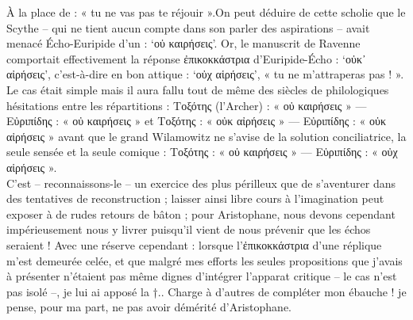 {{À la place de : « tu ne vas pas te réjouir ».}On peut déduire de cette scholie que le Scythe – qui ne tient aucun compte dans son parler des aspirations – avait menacé Écho-Euripide d'un : `οὐ καιρήσεις'. Or, le manuscrit de Ravenne comportait effectivement la réponse ἐπικοκκάστρια d'Euripide-Écho : `οὐκ᾽ αἰρήσεις', c'est-à-dire en bon attique : `οὐχ αἱρήσεις', « tu ne m'attraperas pas ! ». Le cas était simple mais il aura fallu tout de même des siècles de philologiques hésitations entre les répartitions : Τοξότης (l'Archer) : « οὐ καιρήσεις » — Εὐριπίδης : « οὐ καιρήσεις » et Τοξότης : « οὐκ αἰρήσεις » — Εὐριπίδης : « οὐκ αἰρήσεις » avant que le grand Wilamowitz ne s'avise de la solution conciliatrice, la seule sensée et la seule comique : Τοξότης : « οὐ καιρήσεις » — Εὐριπίδης : « οὐχ αἱρήσεις ».\\
C'est -- reconnaissons-le -- un exercice des plus périlleux que de s'aventurer dans des tentatives de reconstruction ; laisser ainsi libre cours à l'imagination peut exposer à de rudes retours de bâton ; pour Aristophane, nous devons cependant impérieusement nous y livrer puisqu'il vient de nous prévenir que les échos seraient  ! Avec une réserve cependant : lorsque l'ἐπικοκκάστρια d'une réplique m'est demeurée celée, et que malgré mes efforts les seules propositions que j'avais à présenter n'étaient pas même dignes d'intégrer l'apparat critique -- le cas n'est pas isolé --, je lui ai apposé la  †.. Charge à d'autres de compléter mon ébauche ! je pense, pour ma part, ne pas avoir démérité d'Aristophane.}

